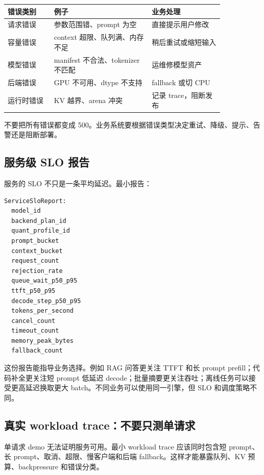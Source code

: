 \begin{center}
\begin{tabular}{p{0.18\linewidth}p{0.38\linewidth}p{0.28\linewidth}}
\toprule
错误类别 & 例子 & 业务处理 \\
\midrule
请求错误 & 参数范围错、prompt 为空 & 直接提示用户修改 \\
容量错误 & context 超限、队列满、内存不足 & 稍后重试或缩短输入 \\
模型错误 & manifest 不合法、tokenizer 不匹配 & 运维修模型资产 \\
后端错误 & GPU 不可用、dtype 不支持 & fallback 或切 CPU \\
运行时错误 & KV 越界、arena 冲突 & 记录 trace，阻断发布 \\
\bottomrule
\end{tabular}
\end{center}

不要把所有错误都变成 500。业务系统要根据错误类型决定重试、降级、提示、告警还是阻断部署。

\subsection{服务级 SLO 报告}

服务的 SLO 不只是一条平均延迟。最小报告：

\begin{lstlisting}[numbers=none,caption={ServiceSloReport 字段}]
ServiceSloReport:
  model_id
  backend_plan_id
  quant_profile_id
  prompt_bucket
  context_bucket
  request_count
  rejection_rate
  queue_wait_p50_p95
  ttft_p50_p95
  decode_step_p50_p95
  tokens_per_second
  cancel_count
  timeout_count
  memory_peak_bytes
  fallback_count
\end{lstlisting}

这份报告能指导业务选择。例如 RAG 问答更关注 TTFT 和长 prompt prefill；代码补全更关注短 prompt 低延迟 decode；批量摘要更关注吞吐；离线任务可以接受更高延迟换取更大 batch。不同业务可以使用同一引擎，但 SLO 和调度策略不同。

\subsection{真实 workload trace：不要只测单请求}

单请求 demo 无法证明服务可用。最小 workload trace 应该同时包含短 prompt、长 prompt、取消、超限、慢客户端和后端 fallback。这样才能暴露队列、KV 预算、backpressure 和错误分类。

